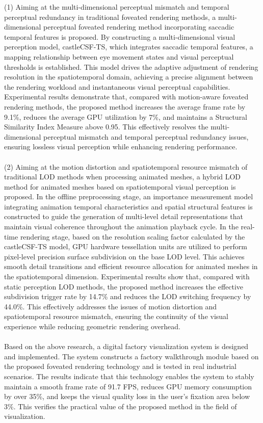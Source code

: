 \begin{englishabstract}
(1) Aiming at the multi-dimensional perceptual mismatch and temporal perceptual redundancy in traditional foveated rendering methods, a multi-dimensional perceptual foveated rendering method incorporating saccadic temporal features is proposed. By constructing a multi-dimensional visual perception model, castleCSF-TS, which integrates saccadic temporal features, a mapping relationship between eye movement states and visual perceptual thresholds is established. This model drives the adaptive adjustment of rendering resolution in the spatiotemporal domain, achieving a precise alignment between the rendering workload and instantaneous visual perceptual capabilities. Experimental results demonstrate that, compared with motion-aware foveated rendering methods, the proposed method increases the average frame rate by 9.1\%, reduces the average GPU utilization by 7\%, and maintains a Structural Similarity Index Measure above 0.95. This effectively resolves the multi-dimensional perceptual mismatch and temporal perceptual redundancy issues, ensuring lossless visual perception while enhancing rendering performance.
\\~\\
(2) Aiming at the motion distortion and spatiotemporal resource mismatch of traditional LOD methods when processing animated meshes, a hybrid LOD method for animated meshes based on spatiotemporal visual perception is proposed. In the offline preprocessing stage, an importance measurement model integrating animation temporal characteristics and spatial structural features is constructed to guide the generation of multi-level detail representations that maintain visual coherence throughout the animation playback cycle. In the real-time rendering stage, based on the resolution scaling factor calculated by the castleCSF-TS model, GPU hardware tessellation units are utilized to perform pixel-level precision surface subdivision on the base LOD level. This achieves smooth detail transitions and efficient resource allocation for animated meshes in the spatiotemporal dimension. Experimental results show that, compared with static perception LOD methods, the proposed method increases the effective subdivision trigger rate by 14.7\% and reduces the LOD switching frequency by 44.0\%. This effectively addresses the issues of motion distortion and spatiotemporal resource mismatch, ensuring the continuity of the visual experience while reducing geometric rendering overhead.
\\~\\
Based on the above research, a digital factory visualization system is designed and implemented. The system constructs a factory walkthrough module based on the proposed foveated rendering technology and is tested in real industrial scenarios. The results indicate that this technology enables the system to stably maintain a smooth frame rate of 91.7 FPS, reduces GPU memory consumption by over 35\%, and keeps the visual quality loss in the user's fixation area below 3\%. This verifies the practical value of the proposed method in the field of visualization.

\end{englishabstract}
